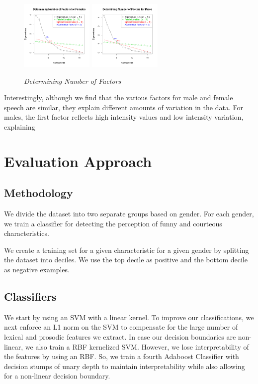 \documentclass[a4paper]{article}
\begin{document}
\begin{figure}[t]
\includegraphics[width = 3.5cm]{graphics/ScreeFem.png}
\includegraphics[width = 3.5cm]{graphics/ScreeMale.png}
\caption{{\it Determining Number of Factors}\label{scree}}  
\label{scree}
\end{figure}

Interestingly, although we find that the various factors for male and female speech are similar, they explain different amounts of variation in the data.  For males, the first factor reflects high intensity values and low intensity variation, explaining   

\section{Evaluation Approach}

\subsection{Methodology}
We divide the dataset into two separate groups based on gender. For each gender, we train a classifier for detecting the perception of funny and courteous characteristics.  

We create a training set for a given characteristic for a given gender by splitting the dataset into deciles. We use the top decile as positive and the bottom decile as negative examples. 

\subsection{Classifiers}
We start by using an SVM with a linear kernel. To improve our classifications, we next enforce an L1 norm on the SVM to compensate for the large number of lexical and prosodic features we extract. In case our decision boundaries are non-linear, we also train a RBF kernelized SVM. However, we lose interpretability of the features by using an RBF. So, we train a fourth Adaboost Classifier with decision stumps of unary depth to maintain interpretability while also allowing for a non-linear decision boundary.  
\end{document}
